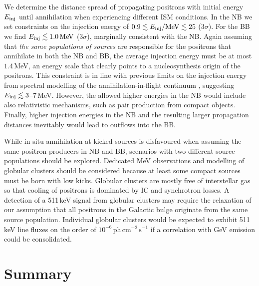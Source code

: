 \documentclass[doublespace,draft,nopageskip]{VTthesis} %
\begin{document}
	We determine the distance spread of propagating positrons with initial energy $E_{\rm inj}$ until annihilation when experiencing different ISM conditions.
	In the NB we set constraints on the injection energy of $0.9 \lesssim E_{\rm inj}/\mathrm{MeV} \lesssim 25$ ($3\sigma$).
	For the BB we find $E_{\rm inj} \lesssim 1.0\,\mathrm{MeV}$ ($3\sigma$), marginally consistent with the NB.
	Again assuming that \textit{the same populations of sources} are responsible for the positrons that annihilate in both the NB and BB, the average injection energy must be at most $1.4$\,MeV, an energy scale that clearly points to a nucleosynthesis origin of the positrons.
	This constraint is in line with previous limits on the injection energy from spectral modelling of the annihilation-in-flight continuum \citep{Beacom2006_511,Sizun2006_511}, suggesting $E_{\rm inj} \lesssim 3$--$7$\,MeV.
	However, the allowed higher energies in the NB would include also relativistic mechanisms, such as pair production from compact objects.
	Finally, higher injection energies in the NB and the resulting larger propagation distances inevitably would lead to outflows into the BB.
	
	
	While in-situ annihilation at kicked sources is disfavoured when assuming the same positron producers in NB and BB, scenarios with two different source populations should be explored.
	Dedicated MeV observations and modelling of globular clusters should be considered because at least some compact sources must be born with low kicks.
	Globular clusters are mostly free of interstellar gas so that cooling of positrons is dominated by IC and synchrotron losses.
	A detection of a 511\,keV signal from globular clusters may require the relaxation of our assumption that all positrons in the Galactic bulge originate from the same source population.
	Individual globular clusters would be expected to exhibit 511\,keV line fluxes on the order of $10^{-6}\,\mathrm{ph\,cm^{-2}\,s^{-1}}$ if a correlation with GeV emission \citep{Bartels2018_binaries511} could be consolidated.

\chapter{Summary} \label{ch:summary}

% 
%    
\end{document}
